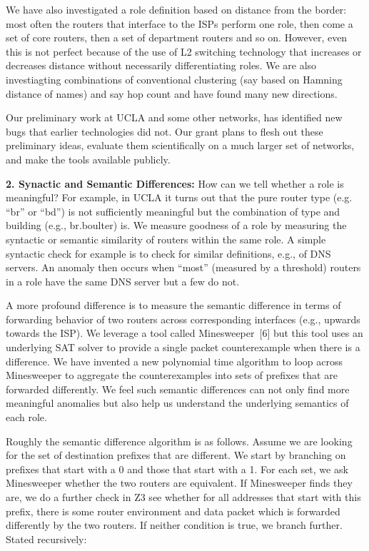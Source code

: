 We have also investigated a role definition based on distance from the border: most often the routers that interface
to the ISPs perform one role, then come a set of core routers, then a set of department routers and so on.  However, even this is not perfect because of the use of L2 switching technology that increases or decreases distance without necessarily differentiating roles.  We are  also investiagting combinations of conventional clustering (say based on Hamning distance of names) and say hop count and have  found many new directions.

Our preliminary work at UCLA and some other networks, has identified new bugs that earlier technologies did not.  Our grant plans to flesh out these preliminary ideas, evaluate them scientifically on a much larger set of networks, and make the tools available publicly. 

{\bf 2. Synactic and Semantic Differences:} How can we tell whether a role is meaningful? For example, in UCLA it turns out that the pure router type (e.g. ``br'' or ``bd'') is not sufficiently meaningful but the combination of type and building (e.g., br.boulter) is.  We measure goodness of a role by measuring the syntactic or semantic similarity of routers within the same role. A simple syntactic  check for example is to check for similar definitions, e.g., of DNS servers.  An anomaly then occurs when ``most'' (measured by a threshold) routers in a role have the same DNS server but a few do not.  

A more profound difference is to measure the semantic difference in terms of forwarding behavior of two routers across corresponding interfaces (e.g., upwards towards the ISP).  We leverage a tool
called Minesweeper~[6] but this tool uses an underlying SAT solver to provide a single packet counterexample 
when there is a difference.  We have invented a new polynomial time algorithm to loop across Minesweeper to aggregate the 
counterexamples into sets of prefixes that are forwarded differently.  We feel such semantic differences can not only find more
meaningful anomalies but also help us understand the underlying semantics of each role.

Roughly the semantic difference algorithm is as follows.  Assume we are looking for the set of destination prefixes that
are different.  We start by branching on prefixes that start with a 0 and those that start with a 1.  For each set, we
ask Minesweeper whether the two routers are equivalent.  If Minesweeper finds they are, we do a further check in Z3 
see whether for all addresses that start with this prefix, there is some router environment and data packet which is
forwarded differently by the two routers.  If neither condition is true, we branch further.   Stated recursively:

